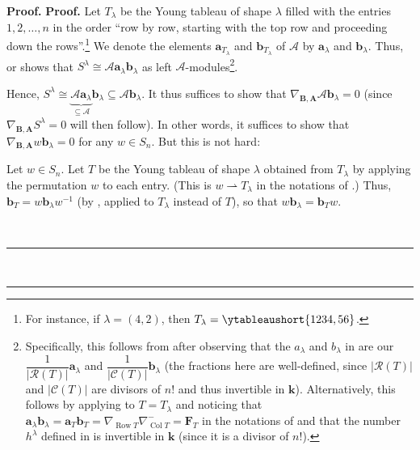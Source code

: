 \documentclass[numbers=enddot,12pt,final,onecolumn,notitlepage]{scrartcl}%
\numberwithin{exer}{subsection}
\theoremstyle{definition}
\newenvironment{proof}[1][Proof]{\noindent\textbf{#1.} }{\ \rule{0.5em}{0.5em}}
\begin{document}
\begin{proof}
\begin{proof}
Let $T_{\lambda}$ be the Young tableau of shape $\lambda$ filled with the
entries $1,2,\ldots,n$ in the order \textquotedblleft row by row, starting
with the top row and proceeding down the rows\textquotedblright.\footnote{For
instance, if $\lambda=\left(  4,2\right)  $, then $T_{\lambda}%
=\ytableaushort{1234,56}$.} We denote the elements $\mathbf{a}_{T_{\lambda}}$
and $\mathbf{b}_{T_{\lambda}}$ of $\mathcal{A}$ by $\mathbf{a}_{\lambda}$ and
$\mathbf{b}_{\lambda}$. Thus, \cite[Theorem 5.12.2]{Etingof} or
\cite[Proposition 5.11.19 \textbf{(c)}]{sga} shows that $S^{\lambda}%
\cong\mathcal{A}\mathbf{a}_{\lambda}\mathbf{b}_{\lambda}$ as left
$\mathcal{A}$-modules\footnote{Specifically, this follows from \cite[Theorem
5.12.2]{Etingof} after observing that the $a_{\lambda}$ and $b_{\lambda}$ in
\cite[Theorem 5.12.2]{Etingof} are our $\dfrac{1}{\left\vert \mathcal{R}%
\left(  T\right)  \right\vert }\mathbf{a}_{\lambda}$ and $\dfrac{1}{\left\vert
\mathcal{C}\left(  T\right)  \right\vert }\mathbf{b}_{\lambda}$ (the fractions
here are well-defined, since $\left\vert \mathcal{R}\left(  T\right)
\right\vert $ and $\left\vert \mathcal{C}\left(  T\right)  \right\vert $ are
divisors of $n!$ and thus invertible in $\mathbf{k}$). Alternatively, this
follows by applying \cite[Theorem 5.5.13 \textbf{(b)}]{sga} to $T=T_{\lambda}$
and noticing that $\mathbf{a}_{\lambda}\mathbf{b}_{\lambda}=\mathbf{a}%
_{T}\mathbf{b}_{T}=\nabla_{\operatorname*{Row}T}\nabla_{\operatorname*{Col}%
T}^{-}=\mathbf{F}_{T}$ in the notations of \cite[Theorem 5.5.13 \textbf{(b)}%
]{sga} and that the number $h^{\lambda}$ defined in \cite[Theorem 5.5.13
\textbf{(b)}]{sga} is invertible in $\mathbf{k}$ (since it is a divisor of
$n!$).}.

Hence, $S^{\lambda}\cong\underbrace{\mathcal{A}\mathbf{a}_{\lambda}%
}_{\subseteq\mathcal{A}}\mathbf{b}_{\lambda}\subseteq\mathcal{A}%
\mathbf{b}_{\lambda}$. It thus suffices to show that $\nabla_{\mathbf{B}%
,\mathbf{A}}\mathcal{A}\mathbf{b}_{\lambda}=0$ (since $\nabla_{\mathbf{B}%
,\mathbf{A}}S^{\lambda}=0$ will then follow). In other words, it suffices to
show that $\nabla_{\mathbf{B},\mathbf{A}}w\mathbf{b}_{\lambda}=0$ for any
$w\in S_{n}$. But this is not hard:

Let $w\in S_{n}$. Let $T$ be the Young tableau of shape $\lambda$ obtained
from $T_{\lambda}$ by applying the permutation $w$ to each entry. (This is
$w\rightharpoonup T_{\lambda}$ in the notations of \cite[Definition
5.3.9]{sga}.) Thus, $\mathbf{b}_{T}=w\mathbf{b}_{\lambda}w^{-1}$ (by
\cite[Proposition 5.5.11]{sga}, applied to $T_{\lambda}$ instead of $T$), so
that $w\mathbf{b}_{\lambda}=\mathbf{b}_{T}w$.


\end{proof}
\end{proof}
\end{document}
